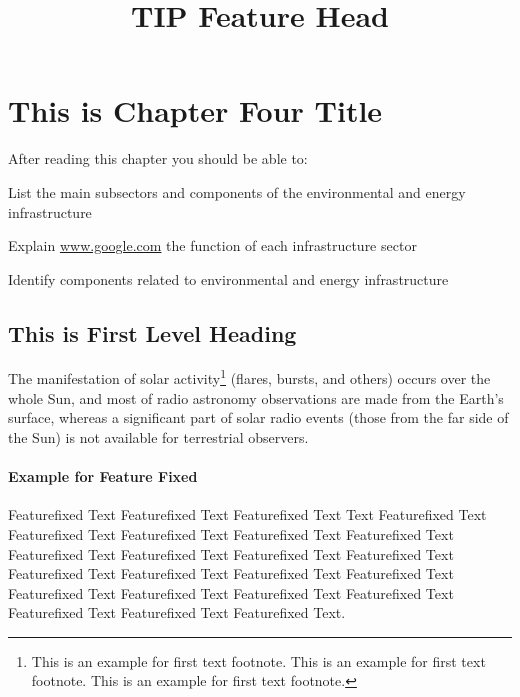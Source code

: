 \chapter{This is Chapter Four Title}

After reading this chapter you should be able to:

\begin{objectives}
\item List the main subsectors and components of the environmental and energy infrastructure

\item Explain \url{www.google.com} the function of each infrastructure sector

\item Identify components related to environmental and energy infrastructure
\end{objectives}

\section{This is First Level Heading}

\lipsum[1-2]

The manifestation of solar activity\footnote{This is an example for first text footnote. This is an example for first text footnote. This is an example for first text footnote.} (flares, bursts, and others) occurs over the whole Sun, and most of radio astronomy observations are made from the Earth's surface, whereas a significant part of solar radio events (those from the far side of the Sun) is not available for terrestrial observers.

\subsubsection*{Example for Feature Fixed}

\begin{featureFixed}[tip]

\title{TIP Feature Head}Featurefixed Text Featurefixed Text Featurefixed Text Text
Featurefixed Text Featurefixed Text Featurefixed Text Featurefixed Text
Featurefixed Text Featurefixed Text Featurefixed Text Featurefixed Text
Featurefixed Text Featurefixed Text Featurefixed Text Featurefixed Text
Featurefixed Text Featurefixed Text Featurefixed Text Featurefixed Text
Featurefixed Text Featurefixed Text Featurefixed Text Featurefixed Text.

\end{featureFixed}

